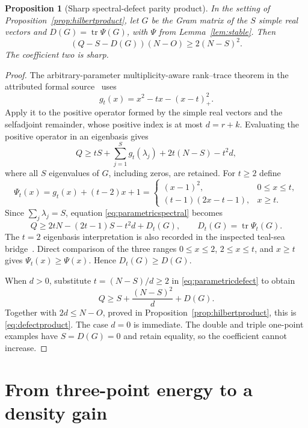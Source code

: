 ﻿\documentclass[11pt]{article}
\newtheorem{proposition}[theorem]{Proposition}
\theoremstyle{remark}
\DeclareMathOperator{\tr}{tr}
\begin{document}
\begin{proposition}[Sharp spectral-defect parity product]
\label{prop:defectproduct}
In the setting of Proposition~\ref{prop:hilbertproduct}, let $G$ be the Gram
matrix of the $S$ simple real vectors and $D(G)=\tr\Psi(G)$, with $\Psi$ from
Lemma~\ref{lem:stable}. Then
\begin{equation}\label{eq:defectproduct}
 (Q-S-D(G))(N-O)\ge2(N-S)^2.
\end{equation}
The coefficient two is sharp.
\end{proposition}
\begin{proof}
The arbitrary-parameter multiplicity-aware rank--trace theorem in the
attributed formal source~\cite{AnthropicFormal} uses
\[
 g_t(x)=x^2-tx-(x-t)_+^2.
\]
Apply it to the positive operator formed by the simple real vectors and the
selfadjoint remainder, whose positive index is at most $d=r+k$. Evaluating the
positive operator in an eigenbasis gives
\begin{equation}\label{eq:parametricspectral}
 Q\ge tS+\sum_{j=1}^S g_t(\lambda_j)+2t(N-S)-t^2d,
\end{equation}
where all $S$ eigenvalues of $G$, including zeros, are retained. For $t\ge2$
define
\[
 \Psi_t(x)=g_t(x)+(t-2)x+1
 =\begin{cases}
 (x-1)^2,&0\le x\le t,\\
 (t-1)(2x-t-1),&x\ge t.
 \end{cases}
\]
Since $\sum_j\lambda_j=S$, equation \eqref{eq:parametricspectral} becomes
\begin{equation}\label{eq:parametricdefect}
 Q\ge2tN-(2t-1)S-t^2d+D_t(G),
 \qquad D_t(G)=\tr\Psi_t(G).
\end{equation}
The $t=2$ eigenbasis interpretation is also recorded in the inspected
teal-sea bridge~\cite{TealSea}. Direct comparison of the three ranges
$0\le x\le2$, $2\le x\le t$, and $x\ge t$ gives
$\Psi_t(x)\ge\Psi(x)$. Hence $D_t(G)\ge D(G)$.

When $d>0$, substitute $t=(N-S)/d\ge2$ in
\eqref{eq:parametricdefect} to obtain
\[
 Q\ge S+\frac{(N-S)^2}{d}+D(G).
\]
Together with $2d\le N-O$, proved in Proposition~\ref{prop:hilbertproduct},
this is \eqref{eq:defectproduct}. The case $d=0$ is immediate. The double
and triple one-point examples have $S=D(G)=0$ and retain equality, so the
coefficient cannot increase.
\end{proof}

\section{From three-point energy to a density gain}
\end{document}
